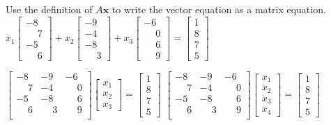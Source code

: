 \documentclass[11pt]{exam}
\begin{document}
\begin{questions}
\addpoints
\question[2]
Use the definition of $A\mathbf{x}$ to write the vector equation as a matrix equation. \newline
$x_{1}\left[\begin{array}{c}-8 \\ \phantom{-}7 \\ -5 \\ \phantom{-}6 \end{array}\right] + x_{2}\left[\begin{array}{c}-9 \\ -4 \\ -8 \\ \phantom{-}3\end{array}\right] + x_{3}\left[\begin{array}{c}-6 \\ \phantom{-}0 \\ \phantom{-}6 \\ \phantom{-}9 \end{array}\right] = \left[\begin{array}{c}1 \\ 8 \\ 7 \\ 5 \end{array}\right]$ \newline
\begin{oneparchoices}
\choice $\left[\begin{array}{ccc}-8 & -9 & -6 \\ \phantom{-}7 & -4 & \phantom{-}0 \\ -5 & -8 & \phantom{-}6 \\ \phantom{-}6 & \phantom{-}3 & \phantom{-}9 \\ \end{array}\right] \left[\begin{array}{c}x_{1}\\x_{2}\\x_{3}\end{array}\right]= \left[\begin{array}{c}1\\8\\7\\5\end{array}\right]$ %
\choice $\left[\begin{array}{ccc}-8 & -9 & -6 \\ \phantom{-}7 & -4 & \phantom{-}0 \\ -5 & -8 & \phantom{-}6 \\ \phantom{-}6 & \phantom{-}3 & \phantom{-}9 \\ \end{array}\right] \left[\begin{array}{c}x_{1}\\x_{2}\\x_{3}\\x_{4}\end{array}\right]= \left[\begin{array}{c}1\\8\\7\\5\end{array}\right]$\\

\end{oneparchoices}
\end{questions}
\end{document}
